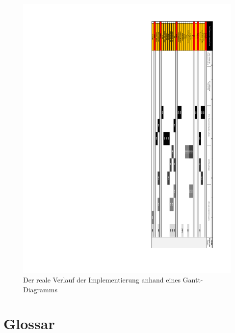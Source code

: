 \documentclass[parskip=full]{scrartcl}
\begin{document}
\begin{figure}[htbp]
    \begin{center}
        \includegraphics[width = 14cm]{Grafiken/Realer_Ablauf_der_Implementierung.pdf}
        \caption{Der reale Verlauf der Implementierung anhand eines Gantt-Diagramms}
        \label{reale}
    \end{center}
\end{figure}

\clearpage
\section{Glossar}\label{glossar}

\renewcommand*{\glossarysection}[2][]{}	%
\printnoidxglossaries				%
\end{document}
